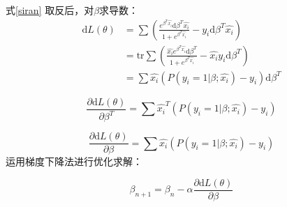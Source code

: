 \documentclass[a4paper]{article}
\begin{document}
	式\eqref{siran}	取反后，对$\beta$求导数：
	\begin{equation}\label{key}
	\begin{split}
	\mathrm{d}L(\theta)
	&=\sum \left(
	\frac{e^{\beta^T\hat{x_i}} \mathrm{d}\beta^T\hat{x_i}}{1+e^{\beta^T\hat{x_i}} }
	- y_i \mathrm{d} \beta^T \hat{x_i}
	\right)\\
	&=\mathrm{tr}\sum \left(
	\frac{\hat{x_i}e^{\beta^T\hat{x_i}} \mathrm{d}\beta^T}{1+e^{\beta^T\hat{x_i}} }
	- \hat{x_i}y_i \mathrm{d} \beta^T
	\right)\\
	&=\sum \hat{x_i}(P(y_i=1|\beta;\hat{x_i})-y_i)\mathrm{d}\beta^T
	\end{split}
	\end{equation}

	\begin{equation*}
		\frac{\partial \mathrm{d}L(\theta)}{\partial \beta^T}=\sum \hat{x_i}^T(P(y_i=1|\beta;\hat{x_i})-y_i)
	\end{equation*}

	\begin{equation}
	\frac{\partial \mathrm{d}L(\theta)}{\partial \beta}=\sum \hat{x_i}(P(y_i=1|\beta;\hat{x_i})-y_i)
	\end{equation}
	运用梯度下降法进行优化求解：

	\[
			\beta_{n+1}=\beta_{n}-\alpha\frac{\partial \mathrm{d}L(\theta)}{\partial \beta}
	\]
\end{document}
